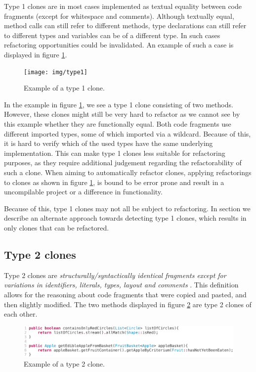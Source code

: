Type 1 clones are in most cases implemented as textual equality between code fragments (except for whitespace and comments). Although textually equal, method calls can still refer to different methods, type declarations can still refer to different types and variables can be of a different type. In such cases refactoring opportunities could be invalidated. An example of such a case is displayed in figure \ref{fig:type1}.

\begin{figure}[H]
  \texttt{[image: img/type1]}
  \caption{Example of a type 1 clone.}
  \label{fig:type1}
\end{figure}

In the example in figure \ref{fig:type1}, we see a type 1 clone consisting of two methods. However, these clones might still be very hard to refactor as we cannot see by this example whether they are functionally equal. Both code fragments use different imported types, some of which imported via a wildcard. Because of this, it is hard to verify which of the used types have the same underlying implementation. This can make type 1 clones less suitable for refactoring purposes, as they require additional judgement regarding the refactorability of such a clone. When aiming to automatically refactor clones, applying refactorings to clones as shown in figure \ref{fig:type1}, is bound to be error prone and result in a uncompilable project or a difference in functionality.

Because of this, type 1 clones may not all be subject to refactoring. In section \label{chap:type1rclones} we describe an alternate approach towards detecting type 1 clones, which results in only clones that can be refactored.

\subsection{Type 2 clones}
Type 2 clones are \textit{structurally/syntactically identical fragments except for variations in identifiers, literals, types, layout and comments} \cite{roy2007survey}. This definition allows for the reasoning about code fragments that were copied and pasted, and then slightly modified. The two methods displayed in figure \ref{fig:type2} are type 2 clones of each other.

\begin{figure}[H]
  \includegraphics[width=1\columnwidth]{img/type2}
  \caption{Example of a type 2 clone.}
  \label{fig:type2}
\end{figure}


